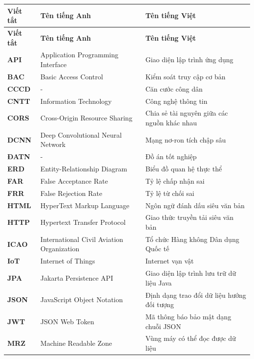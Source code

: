 \documentclass[../DoAn.tex]{subfiles}
\begin{document}
\begin{longtable}{|l|p{6.5cm}|p{6.5cm}|}
\hline
\textbf{Viết tắt} & \textbf{Tên tiếng Anh} & \textbf{Tên tiếng Việt} \\ \hline 
\endfirsthead

\hline
\textbf{Viết tắt} & \textbf{Tên tiếng Anh} & \textbf{Tên tiếng Việt} \\ \hline 
\endhead

\hline
\endfoot

\hline
\endlastfoot

\textbf{API} & Application Programming Interface & Giao diện lập trình ứng dụng \\ \hline
\textbf{BAC} & Basic Access Control & Kiểm soát truy cập cơ bản \\ \hline
\textbf{CCCD} & - & Căn cước công dân \\ \hline
\textbf{CNTT} & Information Technology & Công nghệ thông tin \\ \hline
\textbf{CORS} & Cross-Origin Resource Sharing & Chia sẻ tài nguyên giữa các nguồn khác nhau \\ \hline
\textbf{DCNN} & Deep Convolutional Neural Network & Mạng nơ-ron tích chập sâu \\ \hline
\textbf{ĐATN} & - & Đồ án tốt nghiệp \\ \hline
\textbf{ERD} & Entity-Relationship Diagram & Biểu đồ quan hệ thực thể \\ \hline
\textbf{FAR} & False Acceptance Rate & Tỷ lệ chấp nhận sai \\ \hline
\textbf{FRR} & False Rejection Rate & Tỷ lệ từ chối sai \\ \hline
\textbf{HTML} & HyperText Markup Language & Ngôn ngữ đánh dấu siêu văn bản \\ \hline
\textbf{HTTP} & Hypertext Transfer Protocol & Giao thức truyền tải siêu văn bản \\ \hline
\textbf{ICAO} & International Civil Aviation Organization & Tổ chức Hàng không Dân dụng Quốc tế \\ \hline
\textbf{IoT} & Internet of Things & Internet vạn vật \\ \hline
\textbf{JPA} & Jakarta Persistence API & Giao diện lập trình lưu trữ dữ liệu Java \\ \hline
\textbf{JSON} & JavaScript Object Notation & Định dạng trao đổi dữ liệu hướng đối tượng \\ \hline
\textbf{JWT} & JSON Web Token & Mã thông báo bảo mật dạng chuỗi JSON \\ \hline
\textbf{MRZ} & Machine Readable Zone & Vùng máy có thể đọc được dữ liệu \\ \hline

\end{longtable}
\end{document}
